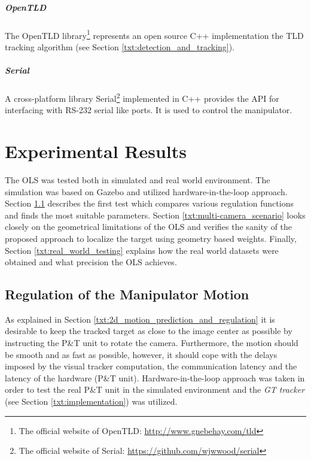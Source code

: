 	\paragraph{OpenTLD} The OpenTLD library\footnote{The official website of OpenTLD: \url{http://www.gnebehay.com/tld}} represents an open source C++ implementation the TLD tracking algorithm (see Section \ref{txt:detection_and_tracking}).	
	
	\paragraph{Serial} A cross-platform library Serial\footnote{The official website of Serial: \url{https://github.com/wjwwood/serial}} implemented in C++ provides the API for interfacing with RS-232 serial like ports. It is used to control the manipulator.
	
\chapter{Experimental Results}

The OLS was tested both in simulated and real world environment. The simulation was based on Gazebo and utilized hardware-in-the-loop approach. Section \ref{txt:test_regulation} describes the first test which compares various regulation functions and finds the most suitable parameters. Section \ref{txt:multi-camera_scenario} looks closely on the geometrical limitations of the OLS and verifies the sanity of the proposed approach to localize the target using geometry based weights. Finally, Section \ref{txt:real_world_testing} explains how the real world datasets were obtained and what precision the OLS achieves.

\section{Regulation of the Manipulator Motion} \label{txt:test_regulation}

As explained in Section \ref{txt:2d_motion_prediction_and_regulation} it is desirable to keep the tracked target as close to the image center as possible by instructing the P\&T unit to rotate the camera. Furthermore, the motion should be smooth and as fast as possible, however, it should cope with the delays imposed by the visual tracker computation, the communication latency and the latency of the hardware (P\&T unit). Hardware-in-the-loop approach was taken in order to test the real P\&T unit in the simulated environment and the \textit{GT tracker} (see Section \ref{txt:implementation}) was utilized.

